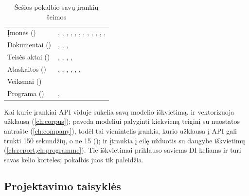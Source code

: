 \begin{table}[H]
\caption{Šešios pokalbio savų įrankių šeimos}\label{tab:chat:families}
\begin{tabularx}{\textwidth}{@{}L{42mm}Y@{}}
\toprule
{} &  \\
\midrule
Įmonės () & , , , , , , , , , , , ,  \\
Dokumentai () & , , ,  \\
Teisės aktai () & , , , ,  \\
Ataskaitos () & , , , , , ,  \\
Veiksmai () &  \\
Programa () & ,  \\
\bottomrule
\end{tabularx}
\end{table}

Kai kurie įrankiai API viduje sukelia savą modelio iškvietimą.  ir
 vektorizuoja užklausą (\cref{ch:corpus}); 
paveda modeliui palyginti kiekvieną teiginį su nuostatos antrašte (\cref{ch:company}), todėl
tai vienintelis įrankis, kurio užklausa į API gali trukti 150 sekundžių, o ne 15
();
 ir  įtraukia į eilę užduotis su daugybe
iškvietimų (\cref{ch:report,ch:programme}). Tie iškvietimai priklauso saviems DI keliams ir turi
savas kelio korteles; pokalbis juos tik paleidžia.

\subsection{Projektavimo taisyklės}\label{sec:chat:rules}

